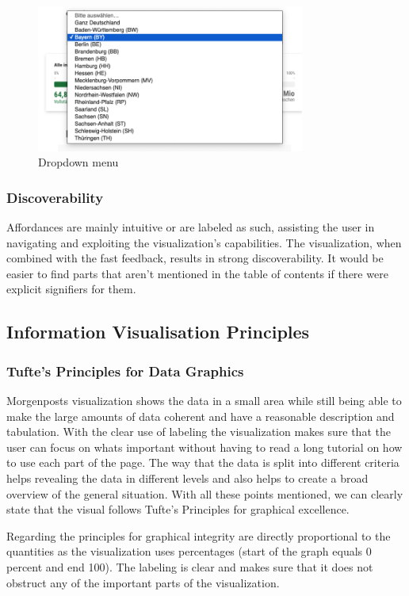 \documentclass[12pt, letterpaper]{article}
\begin{document}
\begin{figure}[h]
    \centering
    \includegraphics[width=250pt]{images/dropdown.png}
    \caption{Dropdown menu}
    \label{fig:my_label}
\end{figure}

\subsubsection{Discoverability}
Affordances are mainly intuitive or are labeled as such, assisting the user in navigating and exploiting the visualization's capabilities. The visualization, when combined with the fast feedback, results in strong discoverability. It would be easier to find parts that aren't mentioned in the table of contents if there were explicit signifiers for them.

\subsection{Information Visualisation Principles}
\subsubsection{Tufte's Principles for Data Graphics}
Morgenposts visualization shows the data in a small area while still being able to make the large amounts of data coherent and have a reasonable description and tabulation. With the clear use of labeling the visualization makes sure that the user can focus on whats important without having to read a long tutorial on how to use each part of the page. The way that the data is split into different criteria helps revealing the data in different levels and also helps to create a broad overview of the general situation.
With all these points mentioned, we can clearly state that the visual follows Tufte's Principles for graphical excellence.

Regarding the principles for graphical integrity are directly proportional to the quantities as the visualization uses percentages (start of the graph equals 0 percent and end 100). The labeling is clear and makes sure that it does not obstruct any of the important parts of the visualization.
\end{document}
